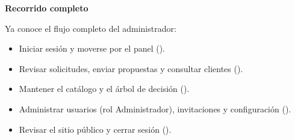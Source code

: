 \begin{tcolorbox}[enhanced, colback=noche, colframe=noche, coltext=white, arc=6pt,
    left=16pt, right=16pt, top=14pt, bottom=14pt, before skip=18pt,
    overlay={\begin{scope}
        \clip (frame.south west) rectangle (frame.north east);
        \pic[opacity=0.35] at ([xshift=-1.6cm, yshift=-0.3cm]frame.north east) {anillo={2.6cm/1.2pt/cielo}};
      \end{scope}}]
  {\montserrat\bfseries\large\color{white}Recorrido completo}\par\vspace{4pt}
  {\color{niebla}Ya conoce el flujo completo del administrador:}\par\vspace{6pt}
  \begin{itemize}[label={\color{cielo}}, leftmargin=1.6em]
    \item Iniciar sesión y moverse por el panel ().
    \item Revisar solicitudes, enviar propuestas y consultar clientes ().
    \item Mantener el catálogo y el árbol de decisión ().
    \item Administrar usuarios (rol Administrador), invitaciones y configuración ().
    \item Revisar el sitio público y cerrar sesión ().
  \end{itemize}
\end{tcolorbox}
